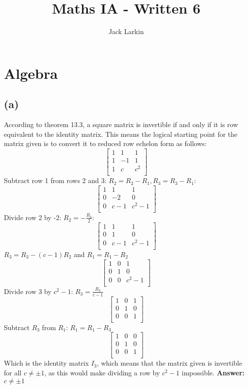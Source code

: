 \documentclass[11pt]{article}
\title{\textbf{Maths IA - Written 6}}
\date{}
\author{Jack Larkin}
\begin{document}
\maketitle
\section*{Algebra}
\subsection*{(a)}
According to theorem 13.3, a square matrix is invertible if and only if it is row equivalent to the identity matrix. This means the logical starting point for the matrix given is to convert it to reduced row echelon form as follows:
$$\begin{bmatrix}
1 & 1 & 1 \\
1 & -1 & 1 \\
1 & c & c^2 \\
\end{bmatrix}$$
Subtract row 1 from rows 2 and 3: $R_2 = R_2 - R_1, R_3=R_3-R_1$:
$$\begin{bmatrix}
1 & 1 & 1 \\
0 & -2 & 0 \\
0 & c -1 & c^2 -1 \\
\end{bmatrix}$$
Divide row 2 by -2: $R_2=-\frac{R_2}{2}$:
$$\begin{bmatrix}
1 & 1 & 1 \\
0 & 1 & 0 \\
0 & c - 1 & c^2 - 1 \\
\end{bmatrix}$$
$R_3=R_3-(c-1)R_2$ and $R_1=R_1-R_2$
$$\begin{bmatrix}
1 & 0 & 1 \\
0 & 1 & 0 \\
0 & 0 & c^2 - 1 \\
\end{bmatrix}$$
Divide row 3 by $c^2-1$: $R_3=\frac{R_3}{c-1}$
$$\begin{bmatrix}
1 & 0 & 1 \\
0 & 1 & 0 \\
0 & 0 & 1 \\
\end{bmatrix}$$
Subtract $R_3$ from $R_1$: $R_1 = R_1 - R_3$
$$\begin{bmatrix}
1 & 0 & 0 \\
0 & 1 & 0 \\
0 & 0 & 1 \\
\end{bmatrix}$$
Which is the identity matrix $I_3$, which means that the matrix given is invertible for all $c\neq \pm 1$, as this would make dividing a row by $c^2-1$ impossible. 
\textbf{Answer: }$c\neq \pm 1$
\end{document}
